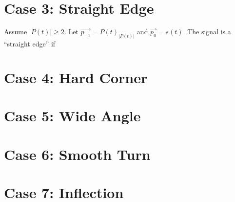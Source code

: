 \documentclass[12pt]{article}
\begin{document}
\section*{Case 3: Straight Edge}

Assume \(|P(t)| \ge 2\).
Let \(\vec{p_{-1}} = {P(t)_{|P(t)|}}\) and \(\vec{p_0} = s(t)\).
The signal is a ``straight edge'' if

\section*{Case 4: Hard Corner}

\section*{Case 5: Wide Angle}

\section*{Case 6: Smooth Turn}

\section*{Case 7: Inflection}
\end{document}
